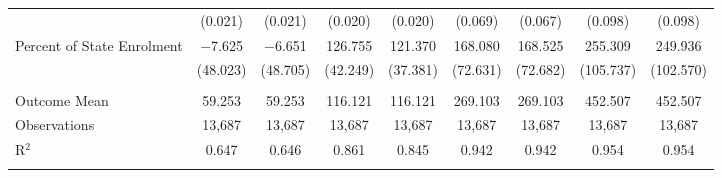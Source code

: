 \begin{tabular}{@{\extracolsep{5pt}}lcccccccc}
  & (0.021) & (0.021) & (0.020) & (0.020) & (0.069) & (0.067) & (0.098) & (0.098) \\ 
  Percent of State Enrolment & $-$7.625 & $-$6.651 & 126.755 & 121.370 & 168.080 & 168.525 & 255.309 & 249.936 \\ 
  & (48.023) & (48.705) & (42.249) & (37.381) & (72.631) & (72.682) & (105.737) & (102.570) \\ 
 \hline \\[-1.8ex] 
Outcome Mean & 59.253 & 59.253 & 116.121 & 116.121 & 269.103 & 269.103 & 452.507 & 452.507 \\ 
Observations & 13,687 & 13,687 & 13,687 & 13,687 & 13,687 & 13,687 & 13,687 & 13,687 \\ 
R$^{2}$ & 0.647 & 0.646 & 0.861 & 0.845 & 0.942 & 0.942 & 0.954 & 0.954 \\ 
\hline 
\hline \\[-1.8ex] 
\end{tabular} 
